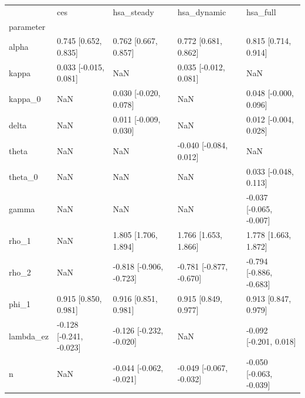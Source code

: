 \begin{tabular}{lllll}
\toprule
 & ces & hsa\_steady & hsa\_dynamic & hsa\_full \\
parameter &  &  &  &  \\
\midrule
alpha & 0.745 [0.652, 0.835] & 0.762 [0.667, 0.857] & 0.772 [0.681, 0.862] & 0.815 [0.714, 0.914] \\
kappa & 0.033 [-0.015, 0.081] & NaN & 0.035 [-0.012, 0.081] & NaN \\
kappa\_0 & NaN & 0.030 [-0.020, 0.078] & NaN & 0.048 [-0.000, 0.096] \\
delta & NaN & 0.011 [-0.009, 0.030] & NaN & 0.012 [-0.004, 0.028] \\
theta & NaN & NaN & -0.040 [-0.084, 0.012] & NaN \\
theta\_0 & NaN & NaN & NaN & 0.033 [-0.048, 0.113] \\
gamma & NaN & NaN & NaN & -0.037 [-0.065, -0.007] \\
rho\_1 & NaN & 1.805 [1.706, 1.894] & 1.766 [1.653, 1.866] & 1.778 [1.663, 1.872] \\
rho\_2 & NaN & -0.818 [-0.906, -0.723] & -0.781 [-0.877, -0.670] & -0.794 [-0.886, -0.683] \\
phi\_1 & 0.915 [0.850, 0.981] & 0.916 [0.851, 0.981] & 0.915 [0.849, 0.977] & 0.913 [0.847, 0.979] \\
lambda\_ez & -0.128 [-0.241, -0.023] & -0.126 [-0.232, -0.020] & NaN & -0.092 [-0.201, 0.018] \\
n & NaN & -0.044 [-0.062, -0.021] & -0.049 [-0.067, -0.032] & -0.050 [-0.063, -0.039] \\
\bottomrule
\end{tabular}
